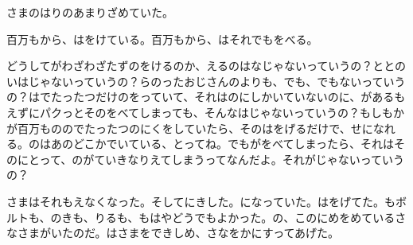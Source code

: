さまのはりのあまりざめていた。

百万もから、はをけている。百万もから、はそれでもをべる。

どうしてがわざわざたずのをけるのか、えるのはなじゃないっていうの？ととのいはじゃないっていうの？らのったおじさんのよりも、でも、でもないっていうの？はでたったつだけのをっていて、それはのにしかいていないのに、があるもえずにパクっとそのをべてしまっても、そんなはじゃないっていうの？もしもかが百万もののでたったつのにくをしていたら、そのはをげるだけで、せになれる。のはあのどこかでいている、とってね。でもがをべてしまったら、それはそのにとって、のがていきなりえてしまうってなんだよ。それがじゃないっていうの？

さまはそれもえなくなった。そしてにきした。になっていた。はをげてた。もボルトも、のきも、りるも、もはやどうでもよかった。の、このにめをめているさなさまがいたのだ。はさまをできしめ、さなをかにすってあげた。

